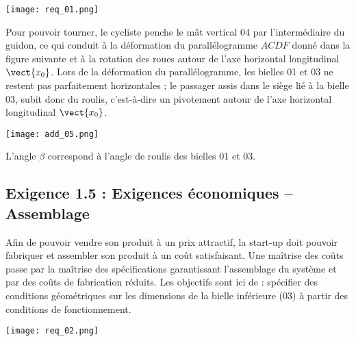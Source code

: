 \begin{center}
\texttt{[image: req\_01.png]}
\end{center}
Pour pouvoir tourner, le cycliste penche le mât vertical 04 par l’intermédiaire du guidon, ce qui conduit à la déformation du parallélogramme $ACDF$ donné dans la figure suivante et à la rotation des roues autour de l’axe horizontal longitudinal
$\vect{x_0}$. Lors de la déformation du parallélogramme, les bielles 01 et 03 ne restent pas parfaitement horizontales ; le passager assis dans le siège lié à la bielle 03, subit donc du roulis, c’est-à-dire un pivotement autour de l’axe horizontal longitudinal $\vect{x_0}$.

\begin{center}
\texttt{[image: add\_05.png]}
\end{center}

L’angle $\beta$  correspond à l’angle de roulis des bielles 01 et 03.



\ifprof
\begin{corrige}
\end{corrige}\else\fi


\subsection*{Exigence 1.5 : Exigences économiques -- Assemblage}
\begin{obj}
Afin de pouvoir vendre son produit à un prix attractif, la start-up doit pouvoir fabriquer et assembler son produit à un coût satisfaisant. Une maîtrise des coûts passe par la maîtrise des spécifications garantissant l’assemblage du système et par des coûts de fabrication réduits. Les objectifs sont ici de : spécifier des conditions géométriques sur les dimensions de la bielle inférieure (03) à partir des conditions de fonctionnement.
\end{obj}

\begin{center}
\texttt{[image: req\_02.png]}
\end{center}


